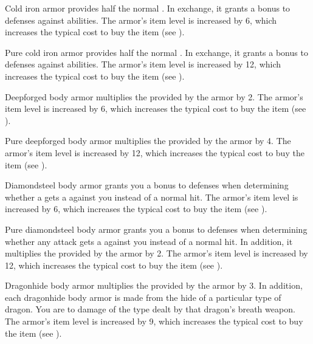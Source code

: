          Cold iron armor provides half the normal .
        In exchange, it grants a  bonus to defenses against  abilities.
        The armor's item level is increased by 6, which increases the typical cost to buy the item (see ).

         Pure cold iron armor provides half the normal .
        In exchange, it grants a  bonus to defenses against  abilities.
        The armor's item level is increased by 12, which increases the typical cost to buy the item (see ).

         Deepforged body armor multiplies the  provided by the armor by 2.
        The armor's item level is increased by 6, which increases the typical cost to buy the item (see ).

         Pure deepforged body armor multiplies the  provided by the armor by 4.
        The armor's item level is increased by 12, which increases the typical cost to buy the item (see ).

         Diamondsteel body armor grants you a  bonus to defenses when determining whether a  gets a  against you instead of a normal hit.
        The armor's item level is increased by 6, which increases the typical cost to buy the item (see ).

         Pure diamondsteel body armor grants you a  bonus to defenses when determining whether any attack gets a  against you instead of a normal hit.
        In addition, it multiplies the  provided by the armor by 2.
        The armor's item level is increased by 12, which increases the typical cost to buy the item (see ).

         Dragonhide body armor multiplies the  provided by the armor by 3.
        In addition, each dragonhide body armor is made from the hide of a particular type of dragon.
        You are  to damage of the type dealt by that dragon's breath weapon.
        The armor's item level is increased by 9, which increases the typical cost to buy the item (see ).

